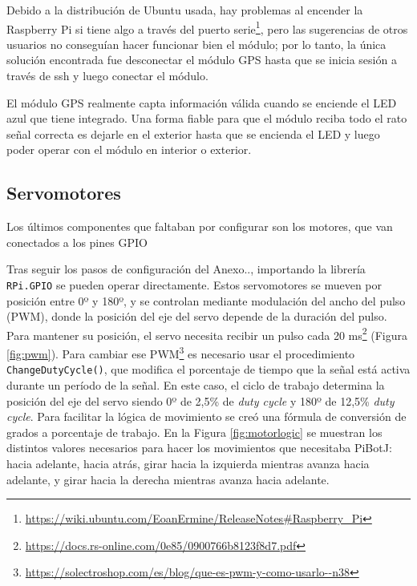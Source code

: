 Debido a la distribución de Ubuntu usada, hay problemas al encender la Raspberry Pi si tiene algo a través del puerto serie\footnote{\url{https://wiki.ubuntu.com/EoanErmine/ReleaseNotes\#Raspberry_Pi}}, pero las sugerencias de otros usuarios no conseguían hacer funcionar bien el módulo; por lo tanto, la única solución encontrada fue desconectar el módulo \acs{GPS} hasta que se inicia sesión a través de ssh y luego conectar el módulo.

El módulo GPS realmente capta información válida cuando se enciende el LED azul que tiene integrado. Una forma fiable para que el módulo reciba todo el rato señal correcta es dejarle en el exterior hasta que se encienda el LED y luego poder operar con el módulo en interior o exterior. 


\subsection{Servomotores}
\label{subsec:configmotores}

Los últimos componentes que faltaban por configurar son los motores, que van conectados a los pines GPIO 


Tras seguir los pasos de configuración del Anexo.., importando la librería \verb|RPi.GPIO| se pueden operar directamente. Estos servomotores se mueven por posición entre 0º y 180º, y se controlan mediante modulación del ancho del pulso (\ac{PWM}), donde la posición del eje del servo depende de la duración del pulso. Para mantener su posición, el servo necesita recibir un pulso cada 20 ms\footnote{\url{https://docs.rs-online.com/0e85/0900766b8123f8d7.pdf}} (Figura \ref{fig:pwm}). Para cambiar ese \ac{PWM}\footnote{\url{https://solectroshop.com/es/blog/que-es-pwm-y-como-usarlo--n38}} es necesario usar el procedimiento \verb|ChangeDutyCycle()|, que modifica el porcentaje de tiempo que la señal está activa durante un período de la señal. En este caso, el ciclo de trabajo determina la posición del eje del servo siendo 0º de 2,5\% de \textit{duty cycle} y 180º de 12,5\% \textit{duty cycle}. Para facilitar la lógica de movimiento se creó una fórmula de conversión de grados a porcentaje de trabajo. En la Figura \ref{fig:motorlogic} se muestran los distintos valores necesarios para hacer los movimientos que necesitaba PiBotJ: hacia adelante, hacia atrás, girar hacia la izquierda mientras avanza hacia adelante, y girar hacia la derecha mientras avanza hacia adelante.

